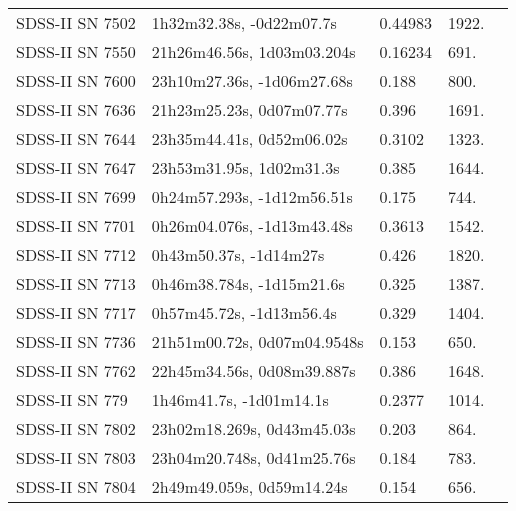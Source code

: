 \begin{longtable}{lllll}
  SDSS-II SN 7502 &       1h32m32.38s, -0d22m07.7s &  0.44983 &          1922. &    \citet{2016SDSSD.C...0000:} \\
  SDSS-II SN 7550 &     21h26m46.56s, 1d03m03.204s &  0.16234 &           691. &    \citet{2016SDSSD.C...0000:} \\
  SDSS-II SN 7600 &     23h10m27.36s, -1d06m27.68s &    0.188 &           800. &    \citet{2011ApJ...738..162S} \\
  SDSS-II SN 7636 &      21h23m25.23s, 0d07m07.77s &    0.396 &          1691. &    \citet{2010ApJ...713.1026D} \\
  SDSS-II SN 7644 &      23h35m44.41s, 0d52m06.02s &   0.3102 &          1323. &    \citet{2011ApJ...738..162S} \\
  SDSS-II SN 7647 &       23h53m31.95s, 1d02m31.3s &    0.385 &          1644. &    \citet{2010ApJ...713.1026D} \\
  SDSS-II SN 7699 &     0h24m57.293s, -1d12m56.51s &    0.175 &           744. &    \citet{2011ApJ...738..162S} \\
  SDSS-II SN 7701 &     0h26m04.076s, -1d13m43.48s &   0.3613 &          1542. &    \citet{2011ApJ...738..162S} \\
  SDSS-II SN 7712 &         0h43m50.37s, -1d14m27s &    0.426 &          1820. &    \citet{2010ApJ...713.1026D} \\
  SDSS-II SN 7713 &      0h46m38.784s, -1d15m21.6s &    0.325 &          1387. &    \citet{2011ApJ...738..162S} \\
  SDSS-II SN 7717 &       0h57m45.72s, -1d13m56.4s &    0.329 &          1404. &    \citet{2010ApJ...713.1026D} \\
  SDSS-II SN 7736 &    21h51m00.72s, 0d07m04.9548s &    0.153 &           650. &    \citet{2011ApJ...738..162S} \\
  SDSS-II SN 7762 &     22h45m34.56s, 0d08m39.887s &    0.386 &          1648. &    \citet{2011ApJ...738..162S} \\
   SDSS-II SN 779 &        1h46m41.7s, -1d01m14.1s &   0.2377 &          1014. &    \citet{2011ApJ...738..162S} \\
  SDSS-II SN 7802 &     23h02m18.269s, 0d43m45.03s &    0.203 &           864. &    \citet{2011ApJ...738..162S} \\
  SDSS-II SN 7803 &     23h04m20.748s, 0d41m25.76s &    0.184 &           783. &    \citet{2011ApJ...738..162S} \\
  SDSS-II SN 7804 &      2h49m49.059s, 0d59m14.24s &    0.154 &           656. &    \citet{2011ApJ...738..162S} \\

\end{longtable}

